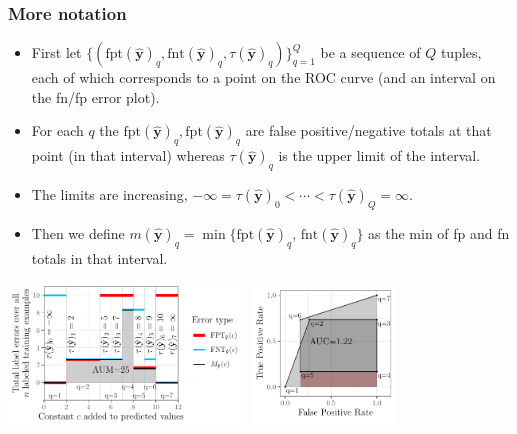 \documentclass{beamer}
\begin{document}
\begin{frame}
  \frametitle{More notation}
  \begin{itemize}
  \item   First let $\{(
\text{fpt}
(\mathbf {\hat y})
_q, \text{fnt}
(\mathbf {\hat y})
_q,
 \tau
(\mathbf {\hat y})
_q
)\}_{q=1}^Q$ 
be a sequence of $Q$ tuples, each of which corresponds to a point on the ROC curve (and an interval on the fn/fp error plot). 
\item For each $q$ the
  $\text{fpt}(\mathbf {\hat y})_q, \text{fpt}(\mathbf {\hat y})_q$ are
  false positive/negative totals at that point (in that interval) whereas
  $\tau(\mathbf {\hat y})_q$ is the upper limit of the interval.
\item The limits are increasing, $ -\infty = \tau
(\mathbf {\hat y})
_0 < \cdots <  \tau
(\mathbf {\hat y})
_Q = \infty$.
\item Then we define $m(\mathbf {\hat y})_q = \min\{
    \text{fpt}(\mathbf {\hat y})_q , \, 
    \text{fnt}(\mathbf {\hat y})_q
\}$ as the min of fp and fn totals in that interval.
  \end{itemize}

  \includegraphics[height=1.5in]{figure-more-than-one-more-aum}
  \includegraphics[height=1.5in]{figure-more-than-one-more-auc}

\end{frame}
\end{document}
